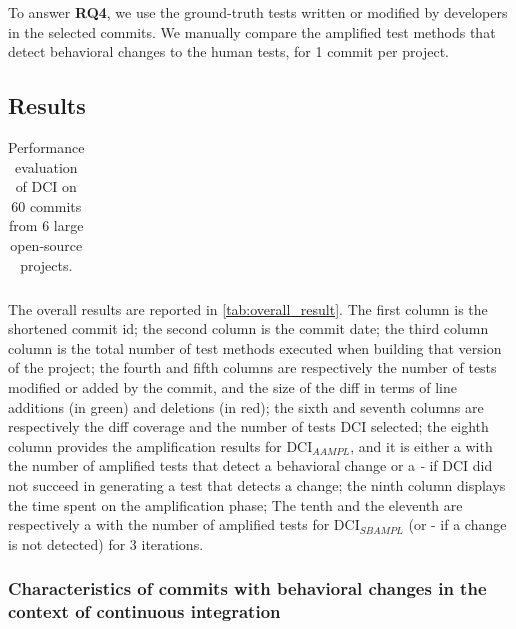 To answer \textbf{RQ4}, we use the ground-truth tests written or modified by developers in the selected commits. %
We manually compare the amplified test methods that detect behavioral changes to the human tests, for 1 commit per project.

\subsection{Results}
\label{subsec:result}
\begin{table}
\centering
\small
\def\arraystretch{0.3}%
\setlength\tabcolsep{.35pt} %
\caption{Performance evaluation of DCI on 60 commits from 6 large open-source projects.}
\label{tab:overall_result}
\begin{tabular}{l|c|rcccc|c|cc|cc|cc|cc}

\end{tabular}
\end{table}

The overall results are reported in \autoref{tab:overall_result}.
The first column is the shortened commit id;
the second column is the commit date;
the third column column is the total number of test methods executed when building that version of the project;
the fourth and fifth columns are respectively the number of tests modified or added by the commit, and the size of the diff in terms of line additions (in green) and deletions (in red);
the sixth and seventh columns are respectively the diff coverage and the number of tests DCI selected;
the eighth column provides the amplification results for DCI$_{AAMPL}$, and it is either a \cmark with the number of amplified tests that detect a behavioral change or a \textit{-} if DCI did not succeed in generating a test that detects a change;
the ninth column displays the time spent on the amplification phase;
The tenth and the eleventh are respectively a \cmark with the number of amplified tests for DCI$_{SBAMPL}$  (or - if a change is not detected) for 3 iterations.

\subsubsection{Characteristics of commits with behavioral changes in the context of continuous integration}
\label{subsubsec:answerq1}


